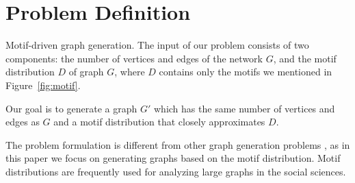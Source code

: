 \section{Problem Definition}
\label{sec:problem}
 Motif-driven graph generation.
 The input of our problem consists of two components: the
number of vertices and edges of the network $G$, and the motif distribution 
$D$ of graph $G$, where $D$ contains only the motifs we mentioned in Figure~\ref{fig:motif}. 

 Our goal is to generate a graph $G'$ which has the same
number of vertices and edges as $G$ and a motif distribution that closely
approximates $D$.

The problem formulation is different from other graph generation problems
\cite{erdds1959random, watts1998collective, albert2002statistical,
newman2009random, molloy1995critical}, as in this paper we focus on
generating graphs based on the motif distribution.
Motif distributions are frequently used for analyzing large graphs in the
social sciences.



